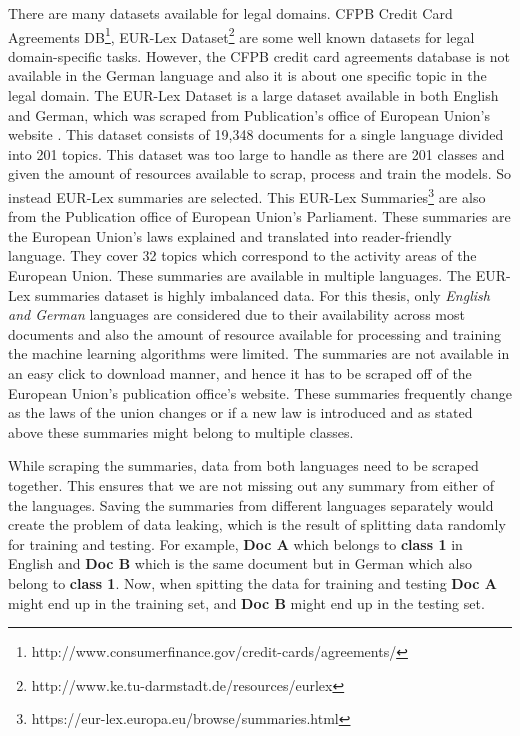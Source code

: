 There are many datasets available for legal domains. CFPB Credit Card Agreements DB\footnote{http://www.consumerfinance.gov/credit-cards/agreements/}, EUR-Lex Dataset\footnote{http://www.ke.tu-darmstadt.de/resources/eurlex} are some well known datasets for legal domain-specific tasks. However, the CFPB credit card agreements database is not available in the German language and also it is about one specific topic in the legal domain. The EUR-Lex Dataset is a large dataset available in both English and German, which was scraped from Publication's office of European Union's website \cite{mencia2010efficient}. This dataset consists of 19,348 documents for a single language divided into 201 topics. This dataset was too large to handle as there are 201 classes and given the amount of resources available to scrap, process and train the models. So instead EUR-Lex summaries are selected. This EUR-Lex Summaries\footnote{https://eur-lex.europa.eu/browse/summaries.html} are also from the Publication office of European Union's Parliament. These summaries are the European Union's laws explained and translated into reader-friendly language. They cover 32 topics which correspond to the activity areas of the European Union. These summaries are available in multiple languages. The EUR-Lex summaries dataset is highly imbalanced data. For this thesis, only \textit{English and German} languages are considered due to their availability across most documents and also the amount of resource available for processing and training the machine learning algorithms were limited. The summaries are not available in an easy click to download manner, and hence it has to be scraped off of the European Union's publication office's website. These summaries frequently change as the laws of the union changes or if a new law is introduced and as stated above these summaries might belong to multiple classes. 

While scraping the summaries, data from both languages need to be scraped together. This ensures that we are not missing out any summary from either of the languages. Saving the summaries from different languages separately would create the problem of data leaking, which is the result of splitting data randomly for training and testing. For example, \textbf{Doc A} which belongs to \textbf{class 1} in English and \textbf{Doc B} which is the same document but in German which also belong to \textbf{class 1}. Now, when spitting the data for training and testing \textbf{Doc A} might end up in the training set, and \textbf{Doc B} might end up in the testing set. 




